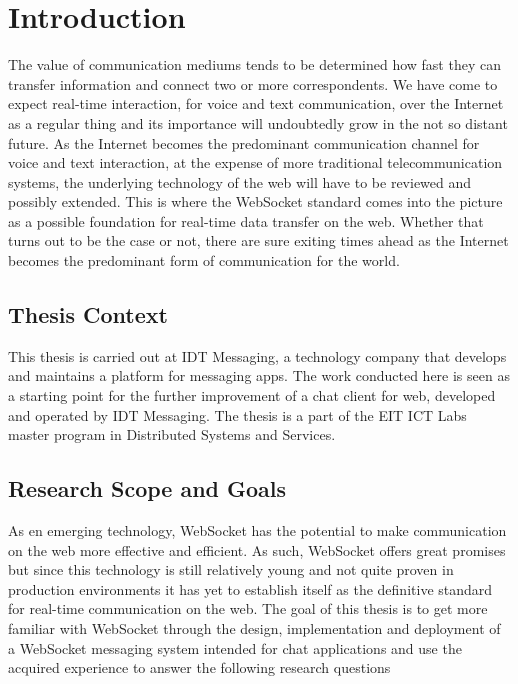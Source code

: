 \chapter{Introduction}
\label{chapter:intro}

The value of communication mediums tends to be determined how fast they can transfer information and connect two or more correspondents. We have come to expect real-time interaction, for voice and text communication, over the Internet as a regular thing and its importance will undoubtedly  grow in the not so distant future. As the Internet becomes the predominant communication channel for voice and text interaction, at the expense of more traditional telecommunication systems, the underlying technology of the web will have to be reviewed and possibly extended. This is where the WebSocket standard comes into the picture as a possible foundation for real-time data transfer on the web. Whether that turns out to be the case or not, there are sure exiting times ahead as the Internet becomes the predominant form of communication for the world.

\section{Thesis Context}

This thesis is carried out at IDT Messaging, a technology company that develops and maintains a platform for messaging apps. The work conducted here is seen as a starting point for the further improvement of a chat client for web, developed and operated by IDT Messaging. The thesis is a part of the EIT ICT Labs master program in Distributed Systems and Services.

\section{Research Scope and Goals}

As en emerging technology, WebSocket has the potential to make communication on the web more effective and efficient. As such, WebSocket offers great promises but since this technology is still relatively young and not quite proven in production environments it has yet to establish itself as the definitive standard for real-time communication on the web. The goal of this thesis is to get more familiar with WebSocket through the design, implementation and deployment of a WebSocket messaging system intended for chat applications and use the acquired experience to answer the following research questions

